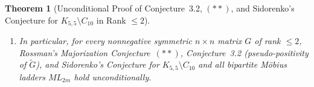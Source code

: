 \documentclass[11pt,a4paper]{article}
\theoremstyle{plain}
\newtheorem{theorem}{Theorem}[section]
\theoremstyle{definition}
\theoremstyle{remark}
\begin{document}
\begin{theorem}[Unconditional Proof of Conjecture~3.2, $(**)$, and Sidorenko's Conjecture for $K_{5,5} \setminus C_{10}$ in Rank $\le 2$]
\begin{enumerate}[label=(\alph*)]
\begin{enumerate}[label=(\roman*)]
\begin{equation}
    \end{equation}
    \item Consequently, in both the positive semidefinite case ($\varepsilon = +1$, where $\alpha \ge \tau_1 > 0$) and the indefinite case ($\varepsilon = -1$, where $\alpha \le |\tau_1|$), Weyl's Monotonicity Theorem yields
    \begin{equation}\label{eq:rank2_majorization}
      \widetilde{\lambda}_2 + \widetilde{\lambda}_{n^2} \;\ge\; 0 \qquad \text{and} \qquad \widetilde{\lambda}_k \;\ge\; 0 \quad (2 \le k \le n^2 - 1).
    \end{equation}
  \end{enumerate}
  \item In particular, for every nonnegative symmetric $n \times n$ matrix $G$ of rank $\le 2$, Rossman's Majorization Conjecture~$(**)$, Conjecture~3.2 (pseudo-positivity of $\widetilde{G}$), and Sidorenko's Conjecture for $K_{5,5} \setminus C_{10}$ and all bipartite M\"obius ladders $ML_{2m}$ hold unconditionally.
\end{enumerate}
\end{theorem}
\end{document}
